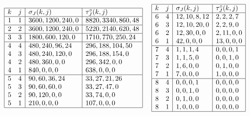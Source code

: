 \documentclass[11pt]{amsart}   %
\theoremstyle{definition}
\theoremstyle{remark}
\numberwithin{equation}{section}
\theoremstyle{theorem}
\begin{document}
\begin{table}[ht]
\[
\begin{array}{|c c|l|l|}
    \hline
    k & j & \sigma_J(k, j) & \tau^\circ_J(k, j) \\
    \hline
1  &  1  &  3600, 1200, 240, 0  &  8820, 3340, 860, 48  \\
    \hline
2  &  2  &  3600, 1200, 240, 0  &  5220, 2140, 620, 48  \\
    \hline
3  &  3  &  1800, 600, 120, 0  &  1710, 770, 250, 24  \\
    \hline
4  &  4  &  480, 240, 96, 24  &  296, 188, 104, 50  \\
4  &  3  &  480, 240, 120, 0  &  296, 188, 154, 0  \\
4  &  2  &  480, 360, 0, 0  &  296, 342, 0, 0  \\
4  &  1  &  840, 0, 0, 0  &  638, 0, 0, 0  \\
    \hline
5  &  4  &  90, 60, 36, 24  &  33, 27, 21, 26  \\
5  &  3  &  90, 60, 60, 0  &  33, 27, 47, 0  \\
5  &  2  &  90, 120, 0, 0  &  33, 74, 0, 0  \\
5  &  1  &  210, 0, 0, 0  &  107, 0, 0, 0  \\
    \hline
\end{array}
\ \ \ \ 
\begin{array}{|c c|l|l|}
    \hline
    k & j & \sigma_J(k, j) & \tau^\circ_J(k, j) \\
    \hline
6  &  4  &  12, 10, 8, 12  &  2, 2, 2, 7  \\
6  &  3  &  12, 10, 20, 0  &  2, 2, 9, 0  \\
6  &  2  &  12, 30, 0, 0  &  2, 11, 0, 0  \\
6  &  1  &  42, 0, 0, 0  &  13, 0, 0, 0  \\
    \hline
7  &  4  &  1, 1, 1, 4  &  0, 0, 0, 1  \\
7  &  3  &  1, 1, 5, 0  &  0, 0, 1, 0  \\
7  &  2  &  1, 6, 0, 0  &  0, 1, 0, 0  \\
7  &  1  &  7, 0, 0, 0  &  1, 0, 0, 0  \\
    \hline
8  &  4  &  0, 0, 0, 1  &  0, 0, 0, 0  \\
8  &  3  &  0, 0, 1, 0  &  0, 0, 0, 0  \\
8  &  2  &  0, 1, 0, 0  &  0, 0, 0, 0  \\
8  &  1  &  1, 0, 0, 0  &  0, 0, 0, 0  \\
    \hline
\end{array}
\]
\caption{The strategic vectors for $N = 8$, $I = 3$}\label{ta:e}
\end{table}
\end{document}
